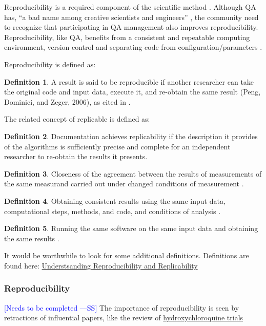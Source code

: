 \documentclass[letterpaper, cleveref]{lipics-v2019}
\newcommand{\authornote}[3]{\textcolor{#1}{[#3 ---#2]}}
\newcommand{\authornote}[3]{}
\newcommand{\wss}[1]{\authornote{blue}{SS}{#1}} %
\theoremstyle{definition}
\newtheorem{defn}{Definition}
\begin{document}
Reproducibility is a required component of the scientific method
\citep{Davison2012}.  Although QA has, ``a bad name among creative
scientists and engineers'' \citep[p.~352]{Roache1998}, the community need to
recognize that participating in QA management also improves reproducibility.
Reproducibility, like QA, benefits from a consistent and repeatable
computing environment, version control and separating code from
configuration/parameters \citep{Davison2012}.

Reproducibility is defined as:

\begin{defn}
  A result is said to be reproducible if another researcher can take the
  original code and input data, execute it, and re-obtain the same result
  (Peng, Dominici, and Zeger, 2006), as cited in
  \citet{BenureauAndRougier2017}.
\end{defn}

The related concept of replicable is defined as:

\begin{defn}
  Documentation achieves replicability if the description it provides of the
  algorithms is sufficiently precise and complete for an independent researcher
  to re-obtain the results it presents.  \citep{BenureauAndRougier2017}
\end{defn}

\begin{defn}
Closeness of the agreement between the results of measurements of the same measurand carried out under changed conditions of measurement \citep{iso2017iec}.
\end{defn}

\begin{defn}
Obtaining consistent results using the same input data, computational steps,  methods, and code, and conditions of analysis \citep{national2019reproducibility}.
\end{defn}

\begin{defn}
Running the same software on the same input data and obtaining the same results \citep{rougier2017sustainable}.
\end{defn}

It would be worthwhile to look for some additional definitions.  Definitions are found here: \href{https://www.ncbi.nlm.nih.gov/books/NBK547546/}{Understsanding Reproducibility and Replicability}

\begin{mybox}
\subsubsection*{Reproducibility} 
\wss{Needs to be completed}
The importance of reproducibility is seen by retractions of influential
papers, like the review of \href{https://www.theguardian
.com/commentisfree/2020/jun/05/lancet-had-to-do-one-of-the-biggest
-retractions-in-modern-history-how-could-this-happen} {hydroxychloroquine
trials}
\end{mybox}
\end{document}

